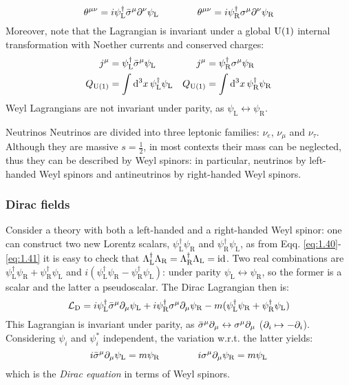 \begin{equation}
  \theta^{\mu \nu} = i \psi_\text{L}^\dagger \bar{\sigma}^\mu \partial^\nu \psi_\text{L}
  \qquad \qquad
  \theta^{\mu \nu} = i \psi_\text{R}^\dagger \sigma^\mu \partial^\nu \psi_\text{R}
  \label{eq:1.82}
\end{equation}
Moreover, note that the Lagrangian is invariant under a global $ \mathrm{U}(1) $ internal transformation with Noether currents and conserved charges:
\begin{align*}
  j^\mu &= \psi_\text{L}^\dagger \bar{\sigma}^\mu \psi_\text{L} & j^\mu &= \psi_\text{R}^\dagger \sigma^\mu \psi_\text{R} \\
  Q_{\mathrm{U}(1)} &= \int \mathrm{d}^3x\, \psi_\text{L}^\dagger \psi_\text{L} & Q_{\mathrm{U}(1)} &= \int \mathrm{d}^3x\, \psi_\text{R}^\dagger \psi_\text{R}
\end{align*}
Weyl Lagrangians are not invariant under parity, as $ \psi_\text{L} \leftrightarrow \psi_\text{R} $.

\begin{example}{Neutrinos}{}
  Neutrinos are divided into three leptonic families: $ \nu_e $, $ \nu_\mu $ and $ \nu_\tau $. Although they are massive $ s = \frac{1}{2} $, in most contexts their mass can be neglected, thus they can be described by Weyl spinors: in particular, neutrinos by left-handed Weyl spinors and antineutrinos by right-handed Weyl spinors.
\end{example}

\subsubsection{Dirac fields}

Consider a theory with both a left-handed and a right-handed Weyl spinor: one can construct two new Lorentz scalars, $ \psi_\text{L}^\dagger \psi_\text{R} $ and $ \psi_\text{R}^\dagger \psi_\text{L} $, as from Eqq. \ref{eq:1.40}-\ref{eq:1.41} it is easy to check that $ \Lambda_\text{L}^\dagger \Lambda_\text{R} = \Lambda_\text{R}^\dagger \Lambda_\text{L} = \operatorname{id} $. Two real combinations are $ \psi_\text{L}^\dagger \psi_\text{R} + \psi_\text{R}^\dagger \psi_\text{L} $ and $ i (\psi_\text{L}^\dagger \psi_\text{R} - \psi_\text{R}^\dagger \psi_\text{L}) $: under parity $ \psi_\text{L} \leftrightarrow \psi_\text{R} $, so the former is a scalar and the latter a pseudoscalar. The Dirac Lagrangian then is:
\begin{equation}
  \mathcal{L}_\text{D} = i \psi_\text{L}^\dagger \bar{\sigma}^\mu \partial_\mu \psi_\text{L} + i \psi_\text{R}^\dagger \sigma^\mu \partial_\mu \psi_\text{R} - m ( \psi_\text{L}^\dagger \psi_\text{R} + \psi_\text{R}^\dagger \psi_\text{L} )
  \label{eq:1.83}
\end{equation}
This Lagrangian is invariant under parity, as $ \bar{\sigma}^\mu \partial_\mu \leftrightarrow \sigma^\mu \partial_\mu $ ($ \partial_i \mapsto - \partial_i $). Considering $ \psi_i $ and $ \psi_i^* $ independent, the variation w.r.t. the latter yields:
\begin{equation}
  i \bar{\sigma}^\mu \partial_\mu \psi_\text{L} = m \psi_\text{R}
  \qquad \qquad
  i \sigma^\mu \partial_\mu \psi_\text{R} = m \psi_\text{L}
  \label{eq:1.84}
\end{equation}
which is the \textit{Dirac equation} in terms of Weyl spinors.

